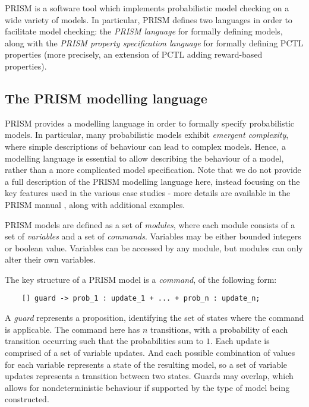 PRISM \cite{kwiatkowska_prism_2011} is a software tool which implements probabilistic model checking on a wide variety of models. In particular, PRISM defines two languages in order to facilitate model checking: the \emph{PRISM language} for formally defining models, along with the \emph{PRISM property specification language} for formally defining PCTL properties (more precisely, an extension of PCTL adding reward-based properties).

\subsection{The PRISM modelling language}
\label{back:PRISM-modelling}

PRISM provides a modelling language in order to formally specify probabilistic models. In particular, many probabilistic models exhibit \emph{emergent complexity}, where simple descriptions of behaviour can lead to complex models. Hence, a modelling language is essential to allow describing the behaviour of a model, rather than a more complicated model specification. Note that we do not provide a full description of the PRISM modelling language here, instead focusing on the key features used in the various case studies - more details are available in the PRISM manual \cite{noauthor_prism_nodate}, along with additional examples.

PRISM models are defined as a set of \emph{modules}, where each module consists of a set of \emph{variables} and a set of \emph{commands}. Variables may be either bounded integers or boolean value. Variables can be accessed by any module, but modules can only alter their own variables.

The key structure of a PRISM model is a \emph{command}, of the following form:

\begin{verbatim}
    [] guard -> prob_1 : update_1 + ... + prob_n : update_n;
\end{verbatim}

A \emph{guard} represents a proposition, identifying the set of states where the command is applicable. The command here has $n$ transitions, with a probability of each transition occurring such that the probabilities sum to $1$. Each update is comprised of a set of variable updates. And each possible combination of values for each variable represents a state of the resulting model, so a set of variable updates represents a transition between two states. Guards may overlap, which allows for nondeterministic behaviour if supported by the type of model being constructed.

